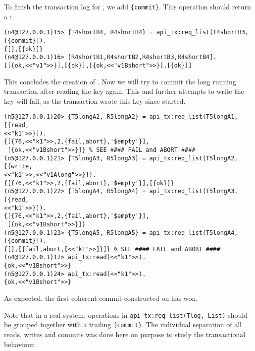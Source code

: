To finish the transaction log for , we add \lstinline|{commit}|. This operation
should return a :

\begin{lstlisting}
(n4@127.0.0.1)15> {T4shortB4, R4shortB4} = api_tx:req_list(T4shortB3, 
[{commit}]).        
{[],[{ok}]}
(n4@127.0.0.1)16> [R4shortB1,R4shortB2,R4shortB3,R4shortB4].
[[{ok,<<"v1">>}],[{ok}],[{ok,<<"v1Bshort">>}],[{ok}]]
\end{lstlisting}
This concludes the creation of . Now we will try to commit the long running
transaction  after reading the key  again. This and further attempts to
write the key will fail, as the transaction  wrote this key since 
started.
\begin{lstlisting}
(n5@127.0.0.1)20> {T5longA2, R5longA2} = api_tx:req_list(T5longA1, [{read, 
<<"k1">>}]).
{[{76,<<"k1">>,2,{fail,abort},'$empty'}],
 [{ok,<<"v1Bshort">>}]} % SEE #### FAIL and ABORT ####
(n5@127.0.0.1)21> {T5longA3, R5longA3} = api_tx:req_list(T5longA2, [{write, 
<<"k1">>,<<"v1Along">>}]).
{[{76,<<"k1">>,2,{fail,abort},'$empty'}],[{ok}]}
(n5@127.0.0.1)22> {T5longA4, R5longA4} = api_tx:req_list(T5longA3, [{read, 
<<"k1">>}]).               
{[{76,<<"k1">>,2,{fail,abort},'$empty'}],
 [{ok,<<"v1Bshort">>}]}
(n5@127.0.0.1)23> {T5longA5, R5longA5} = api_tx:req_list(T5longA4, 
[{commit}]).
{[],[{fail,abort,[<<"k1">>]}]} % SEE #### FAIL and ABORT ####
(n4@127.0.0.1)17> api_tx:read(<<"k1">>).
{ok,<<"v1Bshort">>}
(n5@127.0.0.1)24> api_tx:read(<<"k1">>).
{ok,<<"v1Bshort">>}
\end{lstlisting}

As expected, the first coherent commit  constructed on  has won.

Note that in a real system, operations in \lstinline|api_tx:req_list(Tlog, List)| should
be grouped together with a trailing \lstinline|{commit}|. The individual separation of all
reads, writes and commits was done here on purpose to study the transactional behaviour.

